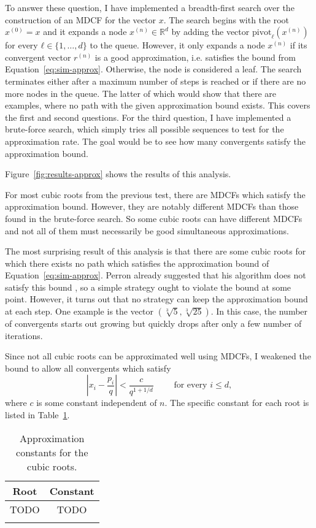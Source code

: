 To answer these question,
I have implemented a breadth-first search over the construction of an MDCF for the vector $x$.
The search begins with the root $x^{(0)} = x$ and it expands a node $x^{(n)} ∈ ℝ^d$
by adding the vector $\mathrm{pivot}_ℓ(x^{(n)})$ for every $ℓ ∈ \{1, …, d\}$ to the queue.
However, it only expands a node $x^{(n)}$
if its convergent vector $r^{(n)}$ is a good approximation,
i.e. satisfies the bound from Equation~\ref{eq:sim-approx}.
Otherwise, the node is considered a leaf.
The search terminates either after a maximum number of steps is reached or if
there are no more nodes in the queue.
The latter of which would show that there are examples, where no path with the
given approximation bound exists.
This covers the first and second questions.
For the third question, I have implemented a brute-force search,
which simply tries all possible sequences to test for the approximation rate.
The goal would be to see how many convergents satisfy the approximation bound.

Figure~\ref{fig:results-approx} shows the results of this analysis.

For most cubic roots from the previous test,
there are MDCFs which satisfy the approximation bound.
However, they are notably different MDCFs than those found in the brute-force
search.
So some cubic roots can have different MDCFs
and not all of them must necessarily be good simultaneous approximations.

The most surprising result of this analysis is that there are some cubic roots
for which there exists no path which satisfies the approximation bound of Equation~\ref{eq:sim-approx}.
Perron already suggested that his algorithm does not satisfy this bound \cite{Perron07},
so a simple strategy ought to violate the bound at some point.
However, it turns out that no strategy can keep the approximation bound at each step.
One example is the vector $(\sqrt[3]{5}, \sqrt[3]{25})$.
In this case, the number of convergents starts out growing but quickly drops
after only a few number of iterations.

Since not all cubic roots can be approximated well using MDCFs,
I weakened the bound to allow all convergents which satisfy
\[
  \left|x_i - \frac{p_i}{q}\right| < \frac{c}{q^{1 + 1/d}} \qquad \text{ for every } i ≤ d,
\]
where $c$ is some constant independent of $n$.
The specific constant for each root is listed in Table~\ref{tbl:approx-const}.
\begin{table}[tbp]
  \centering
  \begin{tabular}{cc}
    \uzlhline
    Root & Constant \\
    \hline
    TODO & TODO \\
    \uzlhline
  \end{tabular}
  \caption{Approximation constants for the cubic roots.}
  \label{tbl:approx-const}
\end{table}


